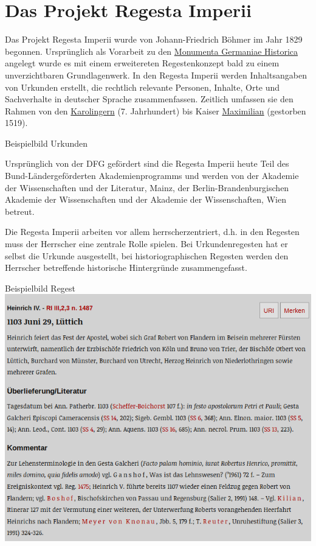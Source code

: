 \documentclass[ngerman,]{scrreprt}
\begin{document}
\section{Das Projekt Regesta Imperii}\label{das-projekt-regesta-imperii}

Das Projekt Regesta Imperii wurde von Johann-Friedrich Böhmer im Jahr 1829 begonnen. Ursprünglich als Vorarbeit zu den \href{https://www.mgh.de}{Monumenta Germaniae Historica} angelegt wurde es mit einem erweitereten Regestenkonzept bald zu einem unverzichtbaren Grundlagenwerk. In den Regesta Imperii werden Inhaltsangaben von Urkunden erstellt, die rechtlich relevante Personen, Inhalte, Orte und Sachverhalte in deutscher Sprache zusammenfassen. Zeitlich umfassen sie den Rahmen von den \href{https://de.wikipedia.org/wiki/Karolinger}{Karolingern} (7. Jahrhundert) bis Kaiser \href{https://de.wikipedia.org/wiki/Maximilian_I._(HRR)}{Maximilian} (gestorben 1519).

Beispielbild Urkunden

Ursprünglich von der DFG gefördert sind die Regesta Imperii heute Teil des Bund-Ländergeförderten Akademienprogramms und werden von der Akademie der Wissenschaften und der Literatur, Mainz, der Berlin-Brandenburgischen Akademie der Wissenschaften und der Akademie der Wissenschaften, Wien betreut.

Die Regesta Imperii arbeiten vor allem herrscherzentriert, d.h. in den Regesten muss der Herrscher eine zentrale Rolle spielen. Bei Urkundenregesten hat er selbst die Urkunde ausgestellt, bei historiographischen Regesten werden den Herrscher betreffende historische Hintergründe zusammengefasst.

Beispielbild Regest \includegraphics{Bilder/RI2Graph/ReggH4-Nr-1487.png}
\end{document}
